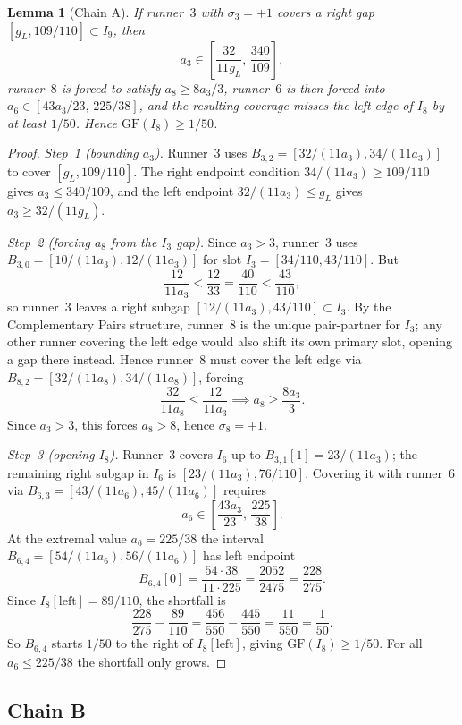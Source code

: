 \documentclass[12pt,a4paper]{amsart}
\newtheorem{lemma}[theorem]{Lemma}
\theoremstyle{definition}
\theoremstyle{remark}
\newcommand{\GF}{\mathrm{GF}}
\begin{document}
\begin{lemma}[Chain A]\label{lem:chainA}
If runner~$3$ with $\sigma_3=+1$ covers a right gap $[g_L,109/110]\subset I_9$, then
\[
  a_3 \in \left[\frac{32}{11g_L},\,\frac{340}{109}\right],
\]
runner~$8$ is forced to satisfy $a_8\ge 8a_3/3$, runner~$6$ is then forced into
$a_6\in[43a_3/23,\,225/38]$, and the resulting coverage misses the left edge of $I_8$ by
at least $1/50$. Hence $\GF(I_8)\ge 1/50$.
\end{lemma}

\begin{proof}
\textit{Step~1 (bounding $a_3$).} Runner~3 uses $B_{3,2}=[32/(11a_3),34/(11a_3)]$
to cover $[g_L,109/110]$. The right endpoint condition $34/(11a_3)\ge 109/110$
gives $a_3\le 340/109$, and the left endpoint $32/(11a_3)\le g_L$
gives $a_3\ge 32/(11g_L)$.

\textit{Step~2 (forcing $a_8$ from the $I_3$ gap).} Since $a_3>3$, runner~3 uses
$B_{3,0}=[10/(11a_3),12/(11a_3)]$ for slot $I_3=[34/110,43/110]$. But
\[
  \frac{12}{11a_3} < \frac{12}{33} = \frac{40}{110} < \frac{43}{110},
\]
so runner~3 leaves a right subgap $[12/(11a_3),43/110]\subset I_3$. By the Complementary
Pairs structure, runner~8 is the unique pair-partner for $I_3$; any other runner covering
the left edge would also shift its own primary slot, opening a gap there instead.
Hence runner~8 must cover the left edge via $B_{8,2}=[32/(11a_8),34/(11a_8)]$, forcing
\[
  \frac{32}{11a_8} \le \frac{12}{11a_3} \implies a_8 \ge \frac{8a_3}{3}.
\]
Since $a_3>3$, this forces $a_8>8$, hence $\sigma_8=+1$.

\textit{Step~3 (opening $I_8$).} Runner~3 covers $I_6$ up to $B_{3,1}[1]=23/(11a_3)$;
the remaining right subgap in $I_6$ is $[23/(11a_3),76/110]$. Covering it with runner~6
via $B_{6,3}=[43/(11a_6),45/(11a_6)]$ requires
\[
  a_6 \in \left[\frac{43a_3}{23},\,\frac{225}{38}\right].
\]
At the extremal value $a_6=225/38$ the interval $B_{6,4}=[54/(11a_6),56/(11a_6)]$ has left
endpoint
\[
  B_{6,4}[0] = \frac{54\cdot 38}{11\cdot 225} = \frac{2052}{2475} = \frac{228}{275}.
\]
Since $I_8[\mathrm{left}]=89/110$, the shortfall is
\[
  \frac{228}{275} - \frac{89}{110}
  = \frac{456}{550} - \frac{445}{550}
  = \frac{11}{550} = \frac{1}{50}.
\]
So $B_{6,4}$ starts $1/50$ to the right of $I_8[\mathrm{left}]$, giving $\GF(I_8)\ge 1/50$.
For all $a_6\le 225/38$ the shortfall only grows.
\end{proof}

\subsection{Chain B}
\end{document}
